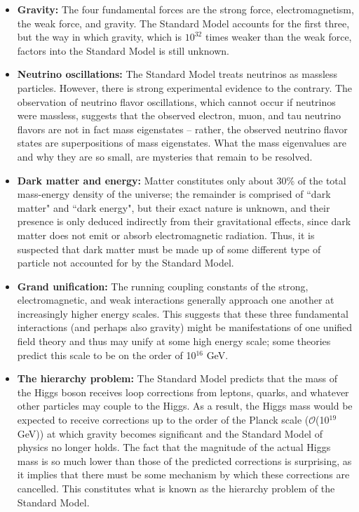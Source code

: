 \begin{itemize}
\item \textbf{Gravity: }The four fundamental forces are the strong force, electromagnetism, the weak force, and gravity. The Standard Model accounts for the first three, but the way in which gravity, which is $10^{32}$ times weaker than the weak force, factors into the Standard Model is still unknown.
\item \textbf{Neutrino oscillations: }The Standard Model treats neutrinos as massless particles. However, there is strong experimental evidence to the contrary. The observation of neutrino flavor oscillations, which cannot occur if neutrinos were massless, suggests that the observed electron, muon, and tau neutrino flavors are not in fact mass eigenstates -- rather, the observed neutrino flavor states are superpositions of mass eigenstates. What the mass eigenvalues are and why they are so small, are mysteries that remain to be resolved.
\item \textbf{Dark matter and energy: }Matter constitutes only about 30\% of the total mass-energy density of the universe; the remainder is comprised of ``dark matter" and ``dark energy", but their exact nature is unknown, and their presence is only deduced indirectly from their gravitational effects, since dark matter does not emit or absorb electromagnetic radiation. Thus, it is suspected that dark matter must be made up of some different type of particle not accounted for by the Standard Model.
\item \textbf{Grand unification: }The running coupling constants of the strong, electromagnetic, and weak interactions generally approach one another at increasingly higher energy scales. This suggests that these three fundamental interactions (and perhaps also gravity) might be manifestations of one unified field theory and thus may unify at some high energy scale; some theories predict this scale to be on the order of 10$^{16}$ GeV.
\item \textbf{The hierarchy problem: }The Standard Model predicts that the mass of the Higgs boson receives loop corrections from leptons, quarks, and whatever other particles may couple to the Higgs. As a result, the Higgs mass would be expected to receive corrections up to the order of the Planck scale ($\mathcal{O}$(10$^{19}$ GeV)) at which gravity becomes significant and the Standard Model of physics no longer holds. The fact that the magnitude of the actual Higgs mass is so much lower than those of the predicted corrections is surprising, as it implies that there must be some mechanism by which these corrections are cancelled. This constitutes what is known as the hierarchy problem of the Standard Model.
\end{itemize}


